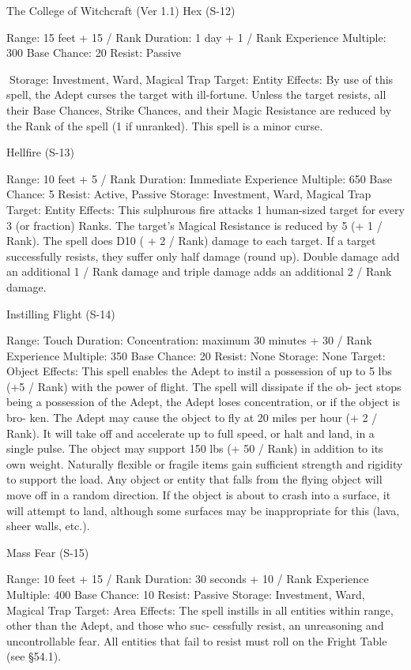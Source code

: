 \begin{Chapter}{The College of Witchcraft (Ver 1.1)}
Hex (S-12) 

Range: 15 feet + 15 / Rank 
Duration: 1 day + 1 / Rank 
Experience Multiple: 300 
Base Chance: 20%
Resist: Passive 

Storage: Investment, Ward, Magical Trap 
Target: Entity 
Effects:  By  use  of  this  spell,  the  Adept  curses  the 
target with ill-fortune. Unless the target resists, all 
their  Base  Chances,  Strike  Chances,  and  their 
Magic  Resistance  are  reduced  by  the  Rank  of  the 
spell (1 if unranked). This spell is a minor curse. 

Hellfire (S-13) 

Range: 10 feet + 5 / Rank 
Duration: Immediate 
Experience Multiple: 650 
Base Chance: 5%
Resist: Active, Passive 
Storage: Investment, Ward, Magical Trap 
Target: Entity 
Effects: This sulphurous fire attacks 1 human-sized 
target for every 3 (or fraction) Ranks. The target’s 
Magical  Resistance  is  reduced  by  5  (+  1  /  Rank). 
The  spell  does  D10  (  +  2  /  Rank)  damage  to  each 
target.  If  a  target  successfully  resists,  they  suffer 
only  half  damage  (round  up).  Double  damage  add 
an  additional  1  /  Rank  damage  and  triple  damage 
adds an additional 2 / Rank damage. 

Instilling Flight (S-14) 

Range: Touch 
Duration:  Concentration:  maximum  30  minutes  + 
30 / Rank 
Experience Multiple: 350 
Base Chance: 20%
Resist: None 
Storage: None 
Target: Object 
Effects:  This  spell  enables  the  Adept  to  instil  a 
possession  of  up  to  5  lbs  (+5  /  Rank)  with  the 
power  of  flight.  The  spell  will  dissipate  if  the  ob-
ject  stops  being  a  possession  of  the  Adept,  the 
Adept  loses  concentration,  or  if  the  object  is  bro-
ken.  The  Adept  may  cause  the  object  to  fly  at  20 
miles  per  hour  (+  2  /  Rank).  It  will  take  off  and 
accelerate  up  to  full  speed,  or  halt  and  land,  in  a 
single pulse. The object may support 150 lbs (+ 50 
/  Rank)  in  addition  to  its  own  weight.  Naturally 
flexible or fragile items gain sufficient strength and 
rigidity  to  support  the  load.  Any  object  or  entity 
that falls from the flying object will  move off in a 
random  direction.  If  the  object  is  about  to  crash 
into  a  surface,  it  will  attempt  to  land,  although 
some  surfaces  may  be  inappropriate  for  this  (lava, 
sheer walls, etc.). 

Mass Fear (S-15) 

Range: 10 feet + 15 / Rank 
Duration: 30 seconds + 10 / Rank 
Experience Multiple: 400 
Base Chance: 10%
Resist: Passive 
Storage: Investment, Ward, Magical Trap 
Target: Area 
Effects:  The  spell  instills  in  all  entities  within 
range,  other  than  the  Adept,  and  those  who  suc-
cessfully  resist,  an  unreasoning  and uncontrollable 
fear.  All  entities  that  fail to  resist  must  roll  on  the 
Fright Table (see §54.1). 


\end{Chapter}
